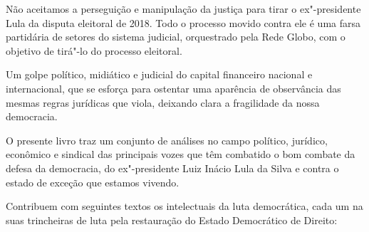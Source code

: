 Não aceitamos a perseguição e manipulação da justiça para tirar o ex"-presidente Lula
da disputa eleitoral de 2018. Todo o processo movido contra ele é uma
farsa partidária de setores do sistema judicial, orquestrado pela Rede Globo, com
o objetivo de tirá"-lo do processo eleitoral.

Um golpe político, midiático e judicial do capital financeiro nacional e internacional, que
se esforça para ostentar uma aparência de observância das mesmas regras jurídicas que
viola, deixando clara a fragilidade da nossa democracia.

\smallskip
\asterisc
\smallskip

O presente livro traz um conjunto de análises no campo político,
jurídico, econômico e sindical das principais vozes que têm combatido o bom combate da defesa
da democracia, do ex"-presidente Luiz Inácio Lula da Silva e
contra o estado de exceção que estamos vivendo.

Contribuem com seguintes textos os intelectuais da luta democrática, cada um na suas trincheiras
de luta pela restauração do Estado Democrático de Direito:


